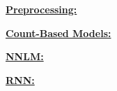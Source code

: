 \documentclass[11pt]{article}
\begin{document}
\begin{appendices}
\textbf{\huge\underline{Preprocessing:}}

\textbf{\huge\underline{Count-Based Models:}}

\textbf{\huge\underline{NNLM:}}

\textbf{\huge\underline{RNN:}}

\end{appendices}
\end{document}
